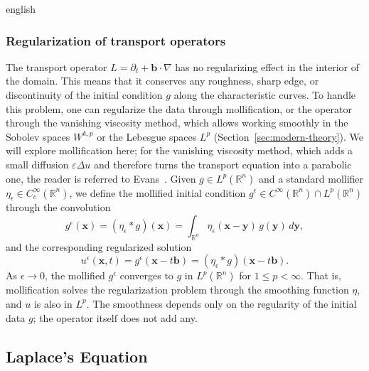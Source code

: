 \documentclass[0000.tex]{subfiles}
\begin{document}
\begin{hyphenrules}{english}
\subsubsection{Regularization of transport operators}
The transport operator $L=\partial_t+\mathbf{b}\cdot\nabla$ has no regularizing effect in the interior of the
domain. This means that it conserves any roughness, sharp edge, or discontinuity of the initial
condition $g$ along the characteristic curves. To handle this problem, one can regularize the data
through mollification, or the operator through the vanishing viscosity method, which allows working
smoothly in the Sobolev spaces $W^{k,p}$ or the Lebesgue spaces $L^p$ (Section~\ref{sec:modern-theory}). We
will explore mollification here; for the vanishing viscosity method, which adds a small diffusion
$\varepsilon\Delta u$ and therefore turns the transport equation into a parabolic one, the reader is
referred to Evans~\cite{evans2010}. Given $g\in L^p(\mathbb{R}^n)$ and a standard mollifier
$\eta_\epsilon\in C_c^\infty(\mathbb{R}^n)$, we define the mollified initial condition
$g^\epsilon\in C^\infty(\mathbb{R}^n)\cap L^p(\mathbb{R}^n)$ through the convolution
\begin{equation}
  g^{\epsilon}(\mathbf{x})=(\eta_\epsilon*g)(\mathbf{x})=\int_{\mathbb{R}^n}\eta_\epsilon(\mathbf{x}-\mathbf{y})\,g(\mathbf{y})\,d\mathbf{y},
  \label{eq:mollifier}
\end{equation}
and the corresponding regularized solution
\begin{equation}
  u^{\epsilon}(\mathbf{x},t)=g^{\epsilon}(\mathbf{x}-t\mathbf{b})=(\eta_\epsilon*g)(\mathbf{x}-t\mathbf{b}).
  \label{eq:transport-mollified}
\end{equation}
As $\epsilon\to0$, the mollified $g^\epsilon$ converges to $g$ in $L^p(\mathbb{R}^n)$ for $1\le p<\infty$. That
is, mollification solves the regularization problem through the smoothing function $\eta$, and $u$ is also in $L^p$. The
smoothness depends only on the regularity of the initial data $g$; the operator itself does not add any.
\subsection{Laplace's Equation}\label{subsec:laplace}


\end{hyphenrules}
\end{document}
